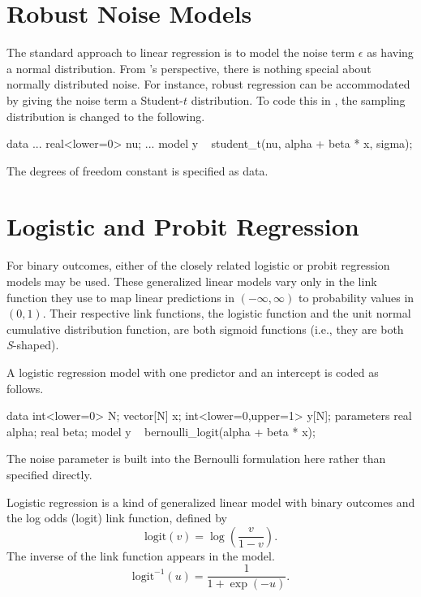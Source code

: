 \section{Robust Noise Models}

The standard approach to linear regression is to model the noise
term $\epsilon$ as having a normal distribution.  From \Stan's
perspective, there is nothing special about normally distributed
noise.  For instance, robust regression can be accommodated by giving
the noise term a Student-$t$ distribution.  To code this in \Stan, the
sampling distribution is changed to the following.
%

\begin{stancode}
data {
  ...
  real<lower=0> nu;
}
...
model {
  y ~ student_t(nu, alpha + beta * x, sigma);
}
\end{stancode}
%
The degrees of freedom constant  is specified as data.

\section{Logistic and Probit Regression}\label{logistic-probit-regression.section}

For binary outcomes, either of the closely related logistic or probit
regression models may be used.  These generalized linear models vary
only in the link function they use to map linear predictions in
$(-\infty,\infty)$ to probability values in $(0,1)$.  Their respective
link functions, the logistic function and the unit normal cumulative distribution
function, are both sigmoid functions (i.e., they are both {\it S}-shaped).

A logistic regression model with one predictor and an intercept is coded as
follows.
%

\begin{stancode}
data {
  int<lower=0> N;
  vector[N] x;
  int<lower=0,upper=1> y[N];
}
parameters {
  real alpha;
  real beta;
}
model {
  y ~ bernoulli_logit(alpha + beta * x);
} 
\end{stancode}
%
The noise parameter is built into the Bernoulli formulation here
rather than specified directly.  

Logistic regression is a kind of generalized linear model with binary
outcomes and the log odds (logit) link function, defined by
%
\[
\mbox{logit}(v) = \log \left( \frac{v}{1-v} \right).
\]
%
The inverse of the link function appears in the model.  
%
\[
\mbox{logit}^{-1}(u) = \frac{1}{1 + \exp(-u)}.
\]
%

